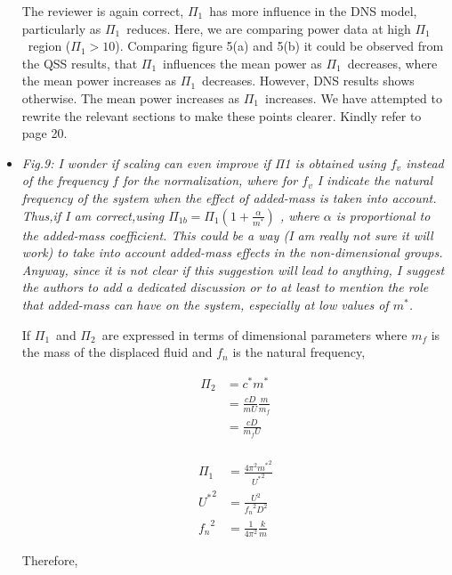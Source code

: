 \documentclass[]{article}
\newcommand{\ustar}{\ensuremath{U^{*}}}
\newcommand{\mstar}{\ensuremath{m^{*}}}
\newcommand{\cstar}{\ensuremath{c^{*}}}
\newcommand{\massstiff}{\ensuremath{\Pi_1}}
\newcommand{\massdamp}{\ensuremath{\Pi_2}}
\begin{document}
\begin{itemize}
The reviewer is again correct, \massstiff\ has more influence in the DNS model, particularly as \massstiff\ reduces. Here, we are comparing power data at high \massstiff \ region ($\massstiff> 10$). Comparing figure 5(a) and 5(b) it could be 
observed from the QSS results, that  \massstiff \ influences the mean power as \massstiff \ decreases, where the mean power increases as \massstiff \ decreases. However, DNS results shows otherwise. The mean power increases as \massstiff \ increases. We have attempted to rewrite the relevant sections to make these points clearer. Kindly refer to page 20.     

\item \emph{ Fig.9: I wonder if scaling can even improve if Π1 is obtained using $f_v$
instead of the frequency $f$ for the normalization, where for $f_v$ I indicate
the natural frequency of the system when the effect of added-mass is taken into account. Thus,if I am correct,using $\Pi_{1b}= \massstiff \left(1+ \frac{\alpha}{\mstar}\right)$ , where $\alpha$ is proportional to the added-mass coefficient. This could be a way (I am really not sure it will work) to take into account added-mass effects in the non-dimensional groups. Anyway, since it is not clear if this suggestion will lead to anything, I suggest the authors to add a dedicated discussion or to at least to mention the role that added-mass can have on the system, especially at low values of \mstar.}

If \massstiff\ and \massdamp\ are expressed in terms of dimensional parameters where $m_{f}$ is  the mass of the displaced fluid and $f_n$ is the natural frequency, 

\begin{align*}
\massdamp & = \cstar \mstar \\
 & = \frac{cD}{mU} \frac{m}{m_{f}}\\
&= \frac{cD}{m_{f}U}\\
\end{align*}

\begin{equation*} 
\begin{split}
\massstiff & = \frac{4 {\pi}^2 {\mstar}^2}{{\ustar}^2} \\
 {\ustar}^2 & = \frac{U^2}{{f_n}^2 D^2} \\
 {f_{n}}^2 & = \frac{1}{4{\pi}^2}\frac{k}{m}
\end{split}
\end{equation*}

Therefore, 


\end{itemize}
\end{document}
